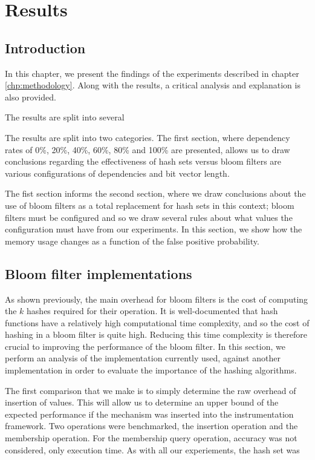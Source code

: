 \chapter{Results} \label{chp:results}
\section{Introduction} \label{sec:results/introduction}
In this chapter, we present the findings of the experiments described in chapter \ref{chp:methodology}. Along with the results, a critical analysis and explanation is also provided.

The results are split into several 

The results are split into two categories. The first section, where dependency rates of 0\%, 20\%, 40\%, 60\%, 80\% and 100\% are presented, allows us to draw conclusions regarding the effectiveness of hash sets versus bloom filters are various configurations of dependencies and bit vector length.

The fist section informs the second section, where we draw conclusions about the use of bloom filters as a total replacement for hash sets in this context; bloom filters must be configured and so we draw several rules about what values the configuration must have from our experiments. In this section, we show how the memory usage changes as a function of the false positive probability.

\section{Bloom filter implementations} \label{sec:results/bfimpl}
As shown previously, the main overhead for bloom filters is the cost of computing the $k$ hashes required for their operation. It is well-documented that hash functions have a relatively high computational time complexity, and so the cost of hashing in a bloom filter is quite high. Reducing this time complexity is therefore crucial to improving the performance of the bloom filter. In this section, we perform an analysis of the implementation currently used, against another implementation in order to evaluate the importance of the hashing algorithms.

The first comparison that we make is to simply determine the raw overhead of insertion of values. This will allow us to determine an upper bound of the expected performance if the mechanism was inserted into the instrumentation framework. Two operations were benchmarked, the insertion operation and the membership operation. For the membership query operation, accuracy was not considered, only execution time. As with all our experiements, the hash set was 

